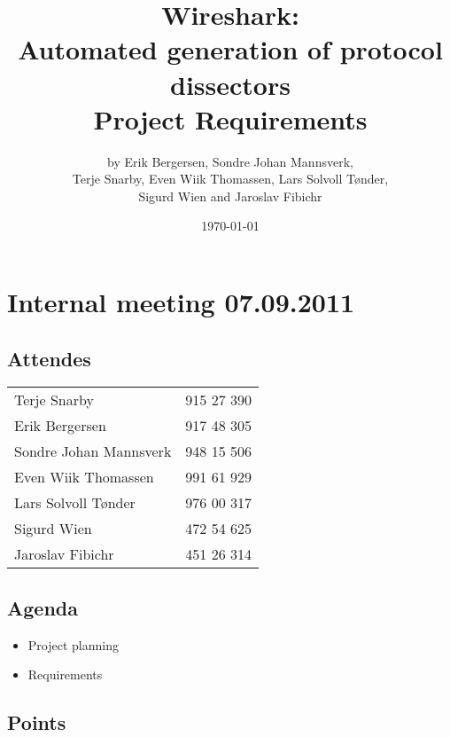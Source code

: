 \documentclass[a4paper, 11pt]{report}
\title{Wireshark:\\ Automated generation of protocol dissectors\\
		Project Requirements}
\author{by Erik Bergersen, Sondre Johan Mannsverk,\\ Terje Snarby,
		Even Wiik Thomassen, Lars Solvoll Tønder,\\ Sigurd Wien
		and Jaroslav Fibichr}
\date{\today}
\begin{document}
\section*{Internal meeting 07.09.2011}

\subsection*{Attendes}

\begin{tabular}{ l  l}
Terje Snarby & 915 27 390 \\
Erik Bergersen & 917 48 305 \\
Sondre Johan Mannsverk & 948 15 506 \\
Even Wiik Thomassen & 991 61 929 \\
Lars Solvoll Tønder & 976 00 317 \\
Sigurd Wien & 472 54 625 \\
Jaroslav Fibichr & 451 26 314 \\

\end{tabular}

\subsection*{Agenda}

\begin{itemize}
\item Project planning
\item Requirements
\end{itemize}

\subsection*{Points}
\end{document}
